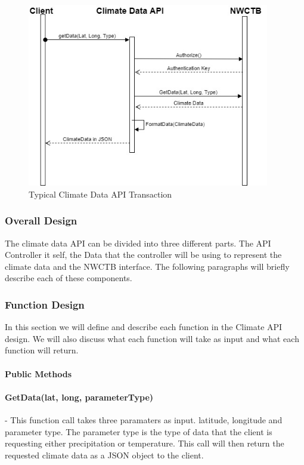 \documentclass[onecolumn, draftclsnofoot,10pt, compsoc]{article}
\begin{document}
		\begin{figure}[htb]
			\begin{center}
				\includegraphics[width=300pt]{UMLDiagrams/ClimateDataAPITransaction.jpg}
			\end{center}
			\caption{Typical Climate Data API Transaction}
			\label{fig:CDAPITrans}
		\end{figure}



			\subsubsection{Overall Design}
				The climate data API can be divided into three different parts. The API Controller it self, the Data that the controller will be using to represent the climate data and the NWCTB interface. The following paragraphs will briefly describe each of these components.
			\subsubsection{Function Design}
			In this section we will define and describe each function in the Climate API design. We will also discuss what each function will take as input and what each function will return.
					\paragraph{\textbf{Public Methods}}


					\paragraph{GetData(lat, long, parameterType)} - This function call takes three paramaters as input. latitude, longitude and parameter type. The parameter type is the type of data that the client is requesting either precipitation or temperature. This call will then return the requested climate data as a JSON object to the client.\\
\end{document}
